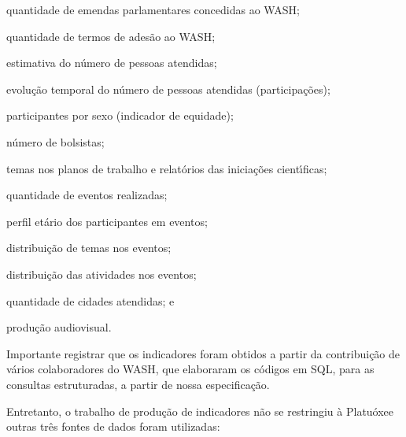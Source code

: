 \documentclass[
12pt,		%
openright,	%
twoside,  %
a4paper,			%
chapter=TITLE,		%
english,			%
french,				%
spanish,			%
brazil				%
]{USPSC-classe/USPSC}
\begin{document}
\begin{alineas}
\item quantidade de emendas parlamentares concedidas ao WASH;
\item quantidade de termos de ades\~ao ao WASH;
\item estimativa do n\'umero de pessoas atendidas;
\item evolu\c{c}\~ao temporal do n\'umero de pessoas atendidas (participa\c{c}\~oes);
\item participantes por sexo (indicador de equidade);
\item n\'umero de bolsistas;
\item temas nos planos de trabalho e relat\'orios das inicia\c{c}\~oes cient\'{\i}ficas;
\item quantidade de eventos realizadas;
\item perfil et\'ario dos participantes em eventos;
\item distribui\c{c}\~ao de temas nos eventos;
\item distribui\c{c}\~ao das atividades nos eventos;
\item quantidade de cidades atendidas; e
\item produ\c{c}\~ao audiovisual.
\end{alineas}

Importante registrar que os indicadores foram obtidos a partir da contribui\c{c}\~ao de v\'arios colaboradores do WASH, que elaboraram os c\'odigos em SQL, para as consultas estruturadas, a partir de nossa especifica\c{c}\~ao.

















Entretanto, o trabalho de produ\c{c}\~ao de indicadores n\~ao se restringiu \`a \textquotedbl  Platu\'oxe\textquotedbl  e outras tr\^es fontes de dados foram utilizadas:
\end{document}
